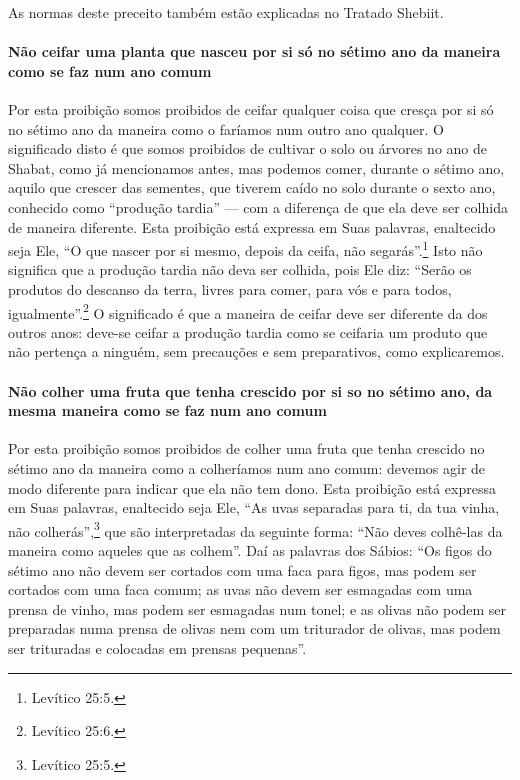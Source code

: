 As normas deste preceito também estão explicadas no Tratado Shebiit.

\paragraph{Não ceifar uma planta que nasceu por si só no sétimo ano da maneira
como se faz num ano comum}

Por esta proibição somos proibidos de ceifar qualquer coisa que cresça
por si só no sétimo ano da maneira como o faríamos num outro ano
qualquer. O significado disto é que somos proibidos de cultivar o solo
ou árvores no ano de Shabat, como já mencionamos antes, mas podemos
comer, durante o sétimo ano, aquilo que crescer das sementes, que
tiverem caído no solo durante o sexto ano, conhecido como ``produção
tardia'' --- com a diferença de que ela deve ser colhida de maneira
diferente. Esta proibição está expressa em Suas palavras, enaltecido
seja Ele, ``O que nascer por si mesmo, depois da ceifa, não segarás''.\footnote{Levítico 25:5.} Isto não significa que a produção tardia não deva ser
colhida, pois Ele diz: ``Serão os produtos do descanso da terra, livres
para comer, para vós e para todos, igualmente''.\footnote{Levítico 25:6.} O
significado é que a maneira de ceifar deve ser diferente da dos outros
anos: deve-se ceifar a produção tardia como se ceifaria um produto que
não pertença a ninguém, sem precauções e sem preparativos, como
explicaremos.

\paragraph{Não colher uma fruta que tenha crescido por si so no sétimo ano, da
mesma maneira como se faz num ano comum}

Por esta proibição somos proibidos de colher uma fruta que tenha
crescido no sétimo ano da maneira como a colheríamos num ano comum: devemos agir de modo diferente para indicar que ela não tem dono. Esta
proibição está expressa em Suas palavras, enaltecido seja Ele, ``As
uvas separadas para ti, da tua vinha, não colherás'',\footnote{Levítico 25:5.}
que são interpretadas da seguinte forma: ``Não deves colhê-las da
maneira como aqueles que as colhem''. Daí as palavras dos Sábios: ``Os
figos do sétimo ano não devem ser cortados com uma faca para figos, mas
podem ser cortados com uma faca comum; as uvas não devem ser esmagadas
com uma prensa de vinho, mas podem ser esmagadas num tonel; e as olivas
não podem ser preparadas numa prensa de olivas nem com um triturador de
olivas, mas podem ser trituradas e colocadas em prensas pequenas''.

